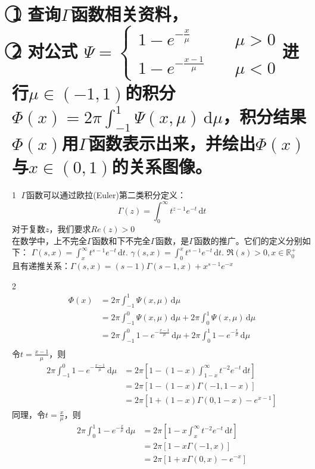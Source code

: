 \documentclass[12pt]{ctexart}
\begin{document}
\section{\textcircled{1} \quad 查询$\Gamma$函数相关资料， \\
\textcircled{2} \quad 对公式 $\Psi = 
\begin{cases}
1 - e^{-\frac{x}{\mu}} & \quad \mu > 0 \\
1 - e^{-\frac{x-1}{\mu}} & \quad \mu < 0
\end{cases}$进行$\mu \in (-1, 1)$的积分$\Phi(x) = 2\pi \int_{-1}^{1} \Psi(x, \mu)\, \mathrm{d}\mu$，积分结果$\Phi(x)$用$\Gamma$函数表示出来，并绘出$\Phi(x)$与$x \in (0, 1)$的关系图像。}
\textcircled{1} $\Gamma$函数可以通过欧拉(Euler)第二类积分定义：
$$\Gamma(z) = \int_0^\infty t^{z-1}e^{-t}\,\mathrm{d}t$$
对于复数$z$，我们要求$Re(z) > 0$ \\
在数学中，上不完全$\Gamma$函数和下不完全$\Gamma$函数，是$\Gamma$函数的推广。它们的定义分别如下：
$\Gamma(s,x) = \int_x^\infty t^{s-1}e^{-t} \, \mathrm{d}t.$ \qquad
$\gamma(s,x) = \int_0^x t^{s-1}e^{-t} \, \mathrm{d}t.$ \qquad
$\Re(s) > 0, x \in \mathbb{R}_0^+$ \\
且有递推关系：$\Gamma(s, x) = (s - 1)\Gamma(s-1, x) + x^{s-1}e^{-x}$
\par
\textcircled{2} \begin{align*}
    \Phi(x) & = 2\pi \int_{-1}^{1} \Psi(x, \mu)\, \mathrm{d}\mu \\  
    & = 2 \pi \int_{-1}^{0}\Psi(x, \mu)\, \mathrm{d}\mu + 2 \pi \int_{0}^{1} \Psi(x, \mu)\, \mathrm{d}\mu \\
    & = 2 \pi \int_{-1}^0 1 - e^{-\frac{x-1}{\mu}} \, \mathrm{d}\mu + 2 \pi \int_0^1 1 - e^{-\frac{x}{\mu}} \, \mathrm{d}\mu \\
\end{align*}
令$t = \frac{x - 1}{\mu}$，则
\begin{align*}
    2 \pi \int_{-1}^0 1 - e^{-\frac{x-1}{\mu}} \, \mathrm{d}\mu 
    & = 2 \pi [1 - (1-x) \int_{1-x}^\infty t^{-2}e^{-t}\,\mathrm{d}t] \\
    & = 2 \pi [1 - (1-x) \Gamma(-1, 1-x)] \\
    & = 2 \pi [1 + (1-x) \Gamma(0, 1-x) - e^{x-1}]
\end{align*}
同理，令$t = \frac{x}{\mu}$，则
\begin{align*}
    2 \pi \int_{0}^1 1 - e^{-\frac{x}{\mu}} \, \mathrm{d}\mu
    & = 2 \pi [1 - x \int_{x}^\infty t^{-2}e^{-t}\,\mathrm{d}t] \\
    & = 2 \pi [1 - x \Gamma(-1, x)] \\
    & = 2 \pi [1 + x \Gamma(0, x) - e^{-x}]
\end{align*}
\end{document}
